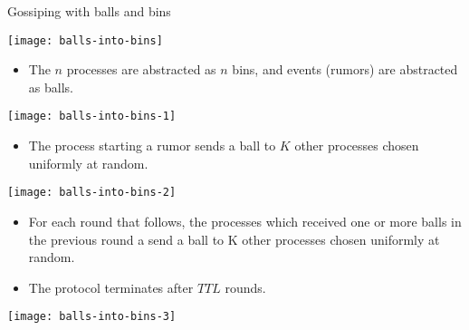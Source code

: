 \begin{frame}{Gossiping with balls and bins}

{  
\vspace{25mm}

\centering
\texttt{[image: balls-into-bins]}
}

{
\vspace{2.5mm}

\begin{itemize}
  
\item The $n$ processes are abstracted as $n$ bins, and events (rumors) are abstracted as balls.

\end{itemize}

\vspace{4mm}
  
\centering
\texttt{[image: balls-into-bins-1]}
}

{
\vspace{2.5mm}
\begin{itemize}

\item The process starting a rumor sends a ball to $K$ other processes chosen uniformly at random.

\end{itemize}
\vspace{8mm}

\centering
\texttt{[image: balls-into-bins-2]}

}

 {
   \begin{itemize}

   \item For each round that follows, the processes which received one or more balls in the previous round a send a ball to K other processes chosen uniformly at random.

\item The protocol terminates after $TTL$ rounds.
   \end{itemize}

 \centering
 \texttt{[image: balls-into-bins-3]}
}

\end{frame}


